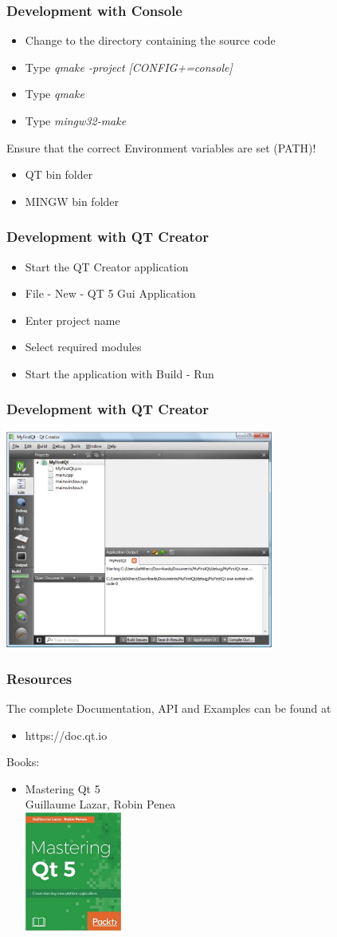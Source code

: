\frame
{
\frametitle{Development with Console}
\begin{itemize}
\item Change to the directory containing the source code
\item Type \emph{qmake -project [CONFIG+=console]}
\item Type \emph{qmake}
\item Type \emph{mingw32-make}
\end{itemize}

Ensure that the correct Environment variables are set (PATH)!\\
\begin{itemize}
\item QT bin folder
\item MINGW bin folder
\end{itemize}
}

\frame
{
\frametitle{Development with QT Creator}
\begin{itemize}
\item Start the QT Creator application
\item File - New - QT 5 Gui Application
\item Enter project name
\item Select required modules
\item Start the application with Build - Run
\end{itemize}
}

\frame
{
\frametitle{Development with QT Creator}
\includegraphics[width=250pt]{img/qtcreator.png}
}

\frame
{
\frametitle{Resources}
The complete Documentation, API and Examples can be found at
\begin{itemize}
\item https://doc.qt.io
\end{itemize}
Books:
\begin{itemize}
\item Mastering Qt 5\\
Guillaume Lazar, Robin Penea\\
\includegraphics[width=90pt]{img/qt5book.jpg}
\end{itemize}
}

